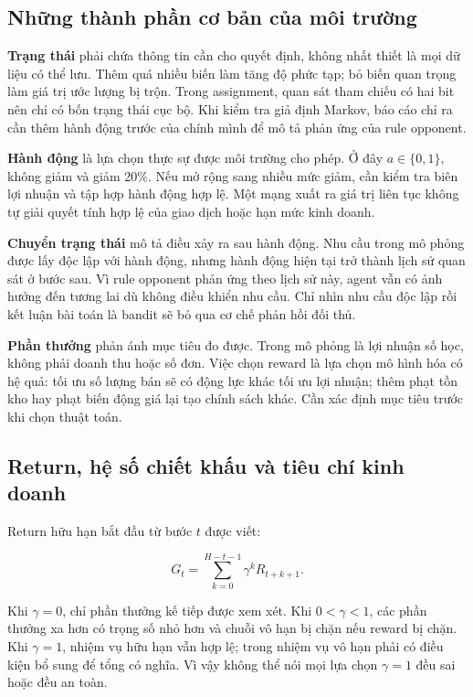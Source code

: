 \subsection{Những thành phần cơ bản của môi
trường}\label{nhux1eefng-thuxe0nh-phux1ea7n-cux1a1-bux1ea3n-cux1ee7a-muxf4i-trux1b0ux1eddng}

\textbf{Trạng thái} phải chứa thông tin cần cho quyết định, không nhất
thiết là mọi dữ liệu có thể lưu. Thêm quá nhiều biến làm tăng độ phức
tạp; bỏ biến quan trọng làm giá trị ước lượng bị trộn. Trong assignment,
quan sát tham chiếu có hai bit nên chỉ có bốn trạng thái cục bộ. Khi
kiểm tra giả định Markov, báo cáo chỉ ra cần thêm hành động trước của
chính mình để mô tả phản ứng của rule opponent.

\textbf{Hành động} là lựa chọn thực sự được môi trường cho phép. Ở đây
\(a\in\{0,1\}\), không giảm và giảm 20\%. Nếu mở rộng sang nhiều mức
giảm, cần kiểm tra biên lợi nhuận và tập hợp hành động hợp lệ. Một mạng
xuất ra giá trị liên tục không tự giải quyết tính hợp lệ của giao dịch
hoặc hạn mức kinh doanh.

\textbf{Chuyển trạng thái} mô tả điều xảy ra sau hành động. Nhu cầu
trong mô phỏng được lấy độc lập với hành động, nhưng hành động hiện tại
trở thành lịch sử quan sát ở bước sau. Vì rule opponent phản ứng theo
lịch sử này, agent vẫn có ảnh hưởng đến tương lai dù không điều khiển
nhu cầu. Chỉ nhìn nhu cầu độc lập rồi kết luận bài toán là bandit sẽ bỏ
qua cơ chế phản hồi đối thủ.

\textbf{Phần thưởng} phản ánh mục tiêu đo được. Trong mô phỏng là lợi
nhuận số học, không phải doanh thu hoặc số đơn. Việc chọn reward là lựa
chọn mô hình hóa có hệ quả: tối ưu số lượng bán sẽ có động lực khác tối
ưu lợi nhuận; thêm phạt tồn kho hay phạt biến động giá lại tạo chính
sách khác. Cần xác định mục tiêu trước khi chọn thuật toán.

\subsection{Return, hệ số chiết khấu và tiêu chí kinh
doanh}\label{return-hux1ec7-sux1ed1-chiux1ebft-khux1ea5u-vuxe0-tiuxeau-chuxed-kinh-doanh}

Return hữu hạn bắt đầu từ bước \(t\) được viết:

\[G_t=\sum_{k=0}^{H-t-1}\gamma^k R_{t+k+1}.\]

Khi \(\gamma=0\), chỉ phần thưởng kế tiếp được xem xét. Khi
\(0<\gamma<1\), các phần thưởng xa hơn có trọng số nhỏ hơn và chuỗi vô
hạn bị chặn nếu reward bị chặn. Khi \(\gamma=1\), nhiệm vụ hữu hạn vẫn
hợp lệ; trong nhiệm vụ vô hạn phải có điều kiện bổ sung để tổng có
nghĩa. Vì vậy không thể nói mọi lựa chọn \(\gamma=1\) đều sai hoặc đều
an toàn.

